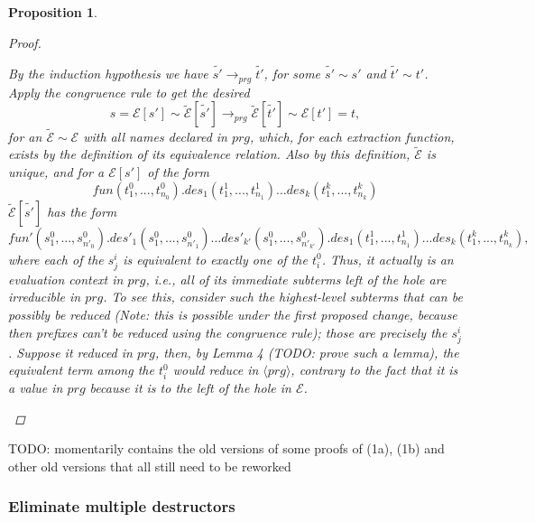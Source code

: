 \documentclass[11pt]{article} %
\newtheorem{proposition}{Proposition}
\begin{document}
\begin{proposition}
\begin{proof}
\begin{enumerate}
By the induction hypothesis we have $\widetilde{s'} \longrightarrow_{prg} \widetilde{t'}$, for some $\widetilde{s'} \sim s'$ and $\widetilde{t'} \sim t'$. Apply the congruence rule to get the desired
\begin{equation*}
s = \mathcal{E}[s'] \sim \widetilde{\mathcal{E}}[\widetilde{s'}] \longrightarrow_{prg} \widetilde{\mathcal{E}}[\widetilde{t'}] \sim \mathcal{E}[t'] = t,
\end{equation*}
for an $\widetilde{\mathcal{E}} \sim \mathcal{E}$ with all names declared in $prg$, which, for each extraction function, exists by the definition of its equivalence relation. Also by this definition, $\widetilde{\mathcal{E}}$ is unique, and for a $\mathcal{E}[s']$ of the form
\begin{equation*}
fun(t^0_1, ..., t^0_{n_0}).des_1(t^1_1, ..., t^1_{n_1})...des_k(t^k_1, ..., t^k_{n_k})
\end{equation*}
$\widetilde{\mathcal{E}}[\widetilde{s'}]$ has the form
\begin{equation*}
fun'(s^0_1, ..., s^0_{n'_0}).des'_1(s^0_1, ..., s^0_{n'_1})...des'_{k'}(s^0_1, ..., s^0_{n'_{k'}}).des_1(t^1_1, ..., t^1_{n_1})...des_k(t^k_1, ..., t^k_{n_k}),
\end{equation*}
where each of the $s^i_j$ is equivalent to exactly one of the $t^0_i$. Thus, it actually is an evaluation context in $prg$, i.e., all of its immediate subterms left of the hole are irreducible in $prg$. To see this, consider such the highest-level subterms that can be possibly be reduced (Note: this is possible under the first proposed change, because then prefixes can't be reduced using the congruence rule); those are precisely the $s^i_j$. Suppose it reduced in $prg$, then, by Lemma 4 (TODO: prove such a lemma), the equivalent term among the $t^0_i$ would reduce in $\langle prg \rangle$, contrary to the fact that it is a value in $prg$ because it is to the left of the hole in $\mathcal{E}$.

\end{enumerate}

\end{proof}

\end{proposition}


TODO: momentarily contains the old versions of some proofs of (1a), (1b) and other old versions that all still need to be reworked

\subsubsection{Eliminate multiple destructors}
\end{document}
